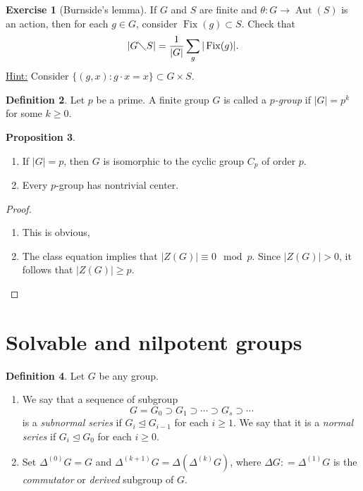\documentclass[10pt,letterpaper,cm]{nupset}
\theoremstyle{definition}
\newtheorem{definition}{Definition}[subsection]
\theoremstyle{theorem}
\newtheorem{prop}[definition]{Proposition}
\newtheorem{exercise}[definition]{Exercise}
\theoremstyle{remark}
\newcommand{\1}{\mathbf{1}}
\newcommand{\0}{\vec 0}
\DeclareMathOperator{\aut}{Aut}
\DeclareMathOperator{\fix}{Fix}
\begin{document}
\begin{exercise}[Burnside's lemma] If $G$ and $S$ are finite and $\theta : G \to \aut(S)$ is an action, then for each $g\in G$, consider $\fix(g) \subset S$. Check that $$|G \diagdown S| = \frac{1}{|G|} \sum_g |\fix(g)|.$$ \underline{Hint:} Consider $\{(g,x): g \cdot x=x\} \subset G \times S$.
\end{exercise}
 
\begin{definition}
Let $p$ be a prime. A finite group $G$ is called a \textit{$p$-group} if $|G| = p^k$ for some $k \geq 0$. 
\end{definition}

\begin{prop}  $ $
\begin{enumerate}
\item If $|G| = p$, then $G$ is isomorphic to the cyclic group $C_p$ of order $p$.
\item Every $p$-group has nontrivial center.
\end{enumerate}
\end{prop}
\begin{proof} $ $
\begin{enumerate}
\item This is obvious,
\item The class equation implies that $|Z(G)| \equiv 0 \mod p$. Since $|Z(G)|>0$, it follows that $|Z(G)|\geq p$.
\end{enumerate}
\end{proof}

\section{Solvable and nilpotent groups}

\begin{definition} Let $G$ be any group.
\begin{enumerate}
\item We say that a sequence of subgroup $$  G= G_0 \supset G_1 \supset \cdots \supset G_s \supset \cdots    $$ is a \textit{subnormal series} if $G_i \unlhd G_{i-1}$ for each $i\geq 1$. We say that it is a \textit{normal series} if $G_i \unlhd G_0$ for each $i\geq 0$. 
\item Set $\Delta^{(0)}G =G$ and $\Delta^{(k+1)}G = \Delta(\Delta^{(k)}G)$, where $\Delta G: = \Delta^{(1)} G$ is the \textit{commutator} or \textit{derived} subgroup of $G$.
\end{enumerate}
\end{definition}
\end{document}
